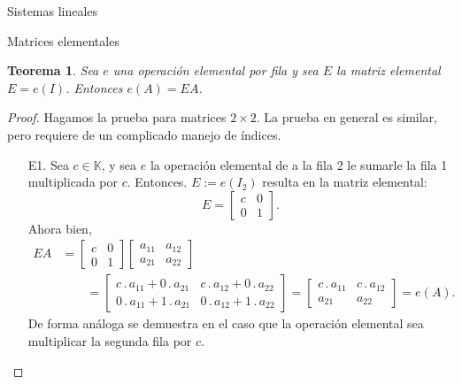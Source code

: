 \documentclass[a4paper,12pt,twoside,spanish]{amsbook}
\newtheorem{teorema}{Teorema}[section]
\theoremstyle{definition}
\theoremstyle{remark}
\newcommand{\K}{\mathbb K}
\begin{document}
\begin{chapter}{Sistemas lineales}
\begin{section}{Matrices elementales}
			\begin{teorema}\label{th-mrtx-elem}
				Sea $e$ una operación elemental por fila y sea $E$ la matriz elemental $E=e(I)$. Entonces $e(A) = EA$.
			\end{teorema}
			\begin{proof}
				Hagamos la prueba para matrices $2 \times 2$. La prueba en general es similar, pero requiere de un complicado manejo de índices.
				\begin{enumerate}
					\item[E1.] Sea  $c \in \K$, y  sea $e$ la operación elemental de a la fila 2 le sumarle  la fila 1 multiplicada por $c$. Entonces. $E:=e(I_2)$ resulta en la matriz elemental:
					\begin{equation*}
					E= \begin{bmatrix} c& 0\\ 0&1\end{bmatrix}.
					\end{equation*}
					Ahora bien,
					\begin{align*}
					E A&=\begin{bmatrix} c& 0\\ 0&1\end{bmatrix}
					\begin{bmatrix} a_{11}&a_{12}\\a_{21}&a_{22}\end{bmatrix} \\
					&\qquad= 
					\begin{bmatrix} 
					c\,.\,a_{11} + 0 \,.\,a_{21}&c\,.\,a_{12}+0\,.\,a_{22}\\
					0\,.\,a_{11} + 1 \,.\,a_{21}&0\,.\,a_{12}+1\,.\,a_{22}\end{bmatrix} 
					=
					\begin{bmatrix} 
					c\,.\,a_{11}&c\,.\,a_{12}\\
					a_{21}&a_{22}\end{bmatrix} = e(A).
					\end{align*}
					De forma análoga se demuestra en el caso que la operación elemental sea  multiplicar la segunda fila por $c$.
					

\end{enumerate}
\end{proof}
\end{section}
\end{chapter}
\end{document}
